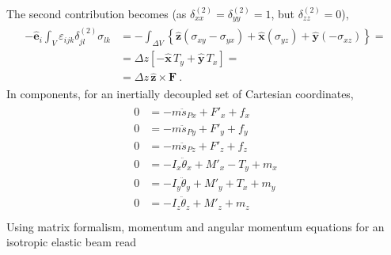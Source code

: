 \documentclass[letterpaper,10pt,english]{jupyterBook}
\begin{document}
\sphinxAtStartPar
The second contribution becomes (as \(\delta^{(2)}_{xx} = \delta^{(2)}_{yy} = 1\), but \(\delta^{(2)}_{zz} = 0\)),
\begin{equation*}
\begin{split}\begin{aligned}
 - \hat{\mathbf{e}}_i \int_{V} \varepsilon_{ijk} \delta^{(2)}_{jl} \sigma_{lk} 
  & = - \int_{\Delta V} \left\{ \hat{\mathbf{z}} ( \sigma_{xy} - \sigma_{yx} ) + \hat{\mathbf{x}} ( \sigma_{yz} ) + \hat{\mathbf{y}} ( - \sigma_{xz} ) \right\} = \\
  & = \Delta z \left[ - \hat{\mathbf{x}} \, T_y + \hat{\mathbf{y}} \, T_x \right] = \\
  & = \Delta z \, \hat{\mathbf{z}} \times \mathbf{F} \ .
\end{aligned}\end{split}
\end{equation*}
\sphinxAtStartPar
In components, for an inertially decoupled set of Cartesian coordinates,
\begin{equation*}
\begin{split}\begin{aligned}
  0 & = - m   \ddot{s}_{Px}   + F'_x       + f_x \\ 
  0 & = - m   \ddot{s}_{Py}   + F'_y       + f_y \\ 
  0 & = - m   \ddot{s}_{Pz}   + F'_z       + f_z \\ 
  0 & = - I_x \ddot{\theta}_x + M'_x - T_y + m_x \\ 
  0 & = - I_y \ddot{\theta}_y + M'_y + T_x + m_y \\ 
  0 & = - I_z \ddot{\theta}_z + M'_z       + m_z \\ 
\end{aligned}\end{split}
\end{equation*}
\sphinxAtStartPar
Using matrix formalism, momentum and angular momentum equations for an isotropic elastic beam read
\end{document}
